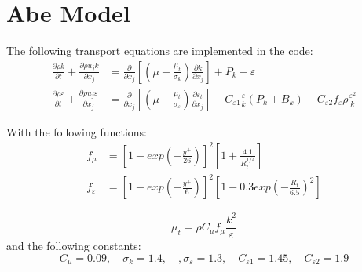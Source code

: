 \documentclass[paper=a4, fontsize=12pt]{scrartcl} %
\newcommand{\pd}{\partial }
\newcommand{\eps}{{\varepsilon}}
\begin{document}
\section{Abe Model}
The following transport equations are implemented in the code:
\begin{equation} \label{eq:ktDeng}
\begin{split}
\frac{\pd \rho k}{\pd t} + \frac{\pd \rho u_j k}{\pd x_j} &= \frac{\pd}{\pd x_j}\left[\left(\mu + \frac{\mu_t}{\sigma_k}\right)\frac{\pd k}{\pd x_j}\right] + P_{k}- \varepsilon \\
\frac{\pd \rho \varepsilon}{\pd t} + \frac{\pd \rho u_j \varepsilon}{\pd x_j} &= \frac{\pd}{\pd x_j}\left[ \left(\mu + \frac{\mu_t}{\sigma_{\varepsilon}}\right)\frac{\pd \varepsilon_t}{\pd x_j}\right] + C_{\varepsilon1}\frac{\varepsilon}{k}\left(P_k+B_k\right)  -C_{\varepsilon2} f_{\varepsilon}\rho\frac{\varepsilon^2}{k}   
\end{split}
\end{equation}

With the following functions:
\begin{equation}
\begin{split}
    f_\mu  &=\left[1-exp\left(-\frac{y^+}{26}\right)\right]^2\left[1+\frac{4.1}{R_t^{1/4}}\right] \\
	f_\eps &= \left[1-exp\left(-\frac{y^+}{6}\right)\right]^2\left[1-0.3exp\left(-\frac{R_t}{6.5}\right)^2\right] 
\end{split}
\end{equation}

\begin{equation}
\mu_t = \rho C_\mu f_\mu \frac{k^2}{\varepsilon}
\end{equation}
and the following constants:
\begin{equation}
C_\mu = 0.09, \quad \sigma_k = 1.4, \quad, \sigma_\varepsilon = 1.3, \quad C_{\varepsilon1} = 1.45, \quad C_{\varepsilon2}=1.9
\end{equation}
\end{document}
